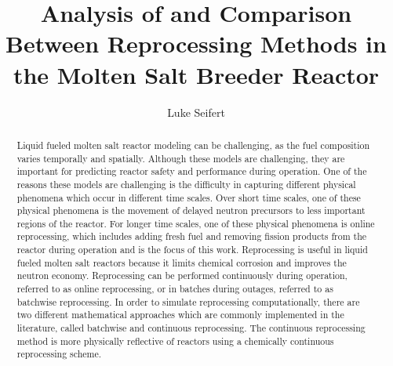 \documentclass[edeposit,fullpage,hidelinks]{uiucthesis2018}
\title{Analysis of and Comparison Between Reprocessing Methods in the Molten Salt Breeder Reactor}
\author{Luke Seifert}
\begin{document}
\maketitle

\frontmatter
\begin{abstract}

Liquid fueled molten salt reactor modeling can be challenging, as the fuel composition varies temporally and spatially.
Although these models are challenging, they are important for predicting reactor safety and performance during operation.
One of the reasons these models are challenging is the difficulty in capturing different physical phenomena which occur in different time scales.
Over short time scales, one of these physical phenomena is the movement of delayed neutron precursors to less important regions of the reactor.
For longer time scales, one of these physical phenomena is online reprocessing, which includes adding fresh fuel and removing fission products from the reactor during operation and is the focus of this work.
Reprocessing is useful in liquid fueled molten salt reactors because it limits chemical corrosion and improves the neutron economy.
Reprocessing can be performed continuously during operation, referred to as online reprocessing, or in batches during outages, referred to as batchwise reprocessing.
In order to simulate reprocessing computationally, there are two different mathematical approaches which are commonly implemented in the literature, called batchwise and continuous reprocessing.
The continuous reprocessing method is more physically reflective of reactors using a chemically continuous reprocessing scheme.

\end{abstract}
\end{document}
